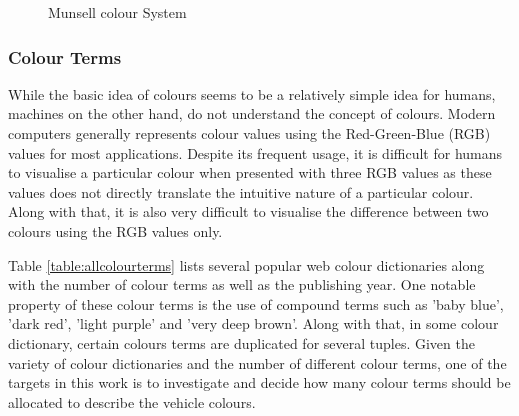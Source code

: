 \begin{figure}[!htb]
  \centering
\caption{Munsell colour System} \label{fig:munsell}
\end{figure}



\subsubsection{Colour Terms}

While the basic idea of colours seems to be a relatively simple idea for humans, machines on the other hand, do not understand the concept of colours. Modern computers generally represents colour values using the Red-Green-Blue (RGB) values for most applications. Despite its frequent usage, it is difficult for humans to visualise a particular colour when presented with three RGB values as these values does not directly translate the intuitive nature of a particular colour. Along with that, it is also very difficult to visualise the difference between two colours using the RGB values only. 

Table \ref{table:allcolourterms} lists several popular web colour dictionaries along with the number of colour terms as well as the publishing year. One notable property of these colour terms is the use of compound terms such as 'baby blue', 'dark red', 'light purple' and 'very deep brown'. Along with that, in some colour dictionary, certain colours terms are duplicated for several tuples. Given the variety of colour dictionaries and the number of different colour terms, one of the targets in this work is to investigate and decide how many colour terms should be allocated to describe the vehicle colours. 

